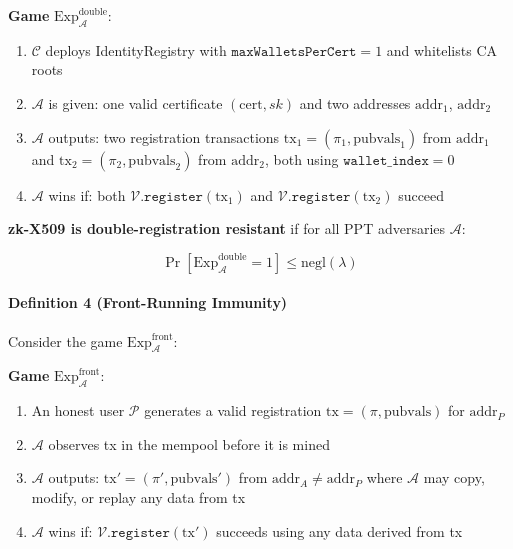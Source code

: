 \documentclass[11pt, a4paper]{article}
\begin{document}
\begin{mdframed}[linewidth=0.5pt, innertopmargin=6pt, innerbottommargin=6pt]
\small
\textbf{Game} $\text{Exp}_{\mathcal{A}}^{\text{double}}$:
\begin{enumerate}[nosep,leftmargin=1.5em]
\item $\mathcal{C}$ deploys IdentityRegistry with $\texttt{maxWalletsPerCert} = 1$ and whitelists CA roots
\item $\mathcal{A}$ is given: one valid certificate $(\text{cert}, sk)$ and two addresses $\text{addr}_1$, $\text{addr}_2$
\item $\mathcal{A}$ outputs: two registration transactions $\text{tx}_1 = (\pi_1, \text{pubvals}_1)$ from $\text{addr}_1$ and $\text{tx}_2 = (\pi_2, \text{pubvals}_2)$ from $\text{addr}_2$, both using $\texttt{wallet\_index} = 0$
\item $\mathcal{A}$ wins if: both $\mathcal{V}.\texttt{register}(\text{tx}_1)$ and $\mathcal{V}.\texttt{register}(\text{tx}_2)$ succeed
\end{enumerate}
\end{mdframed}

\textbf{zk-X509 is double-registration resistant} if for all PPT
adversaries \(\mathcal{A}\):

\[\Pr[\text{Exp}_{\mathcal{A}}^{\text{double}} = 1] \leq \text{negl}(\lambda)\]

\paragraph{Definition 4 (Front-Running
Immunity)}\label{definition-4-front-running-immunity}

Consider the game \(\text{Exp}_{\mathcal{A}}^{\text{front}}\):

\begin{mdframed}[linewidth=0.5pt, innertopmargin=6pt, innerbottommargin=6pt]
\small
\textbf{Game} $\text{Exp}_{\mathcal{A}}^{\text{front}}$:
\begin{enumerate}[nosep,leftmargin=1.5em]
\item An honest user $\mathcal{P}$ generates a valid registration $\text{tx} = (\pi, \text{pubvals})$ for $\text{addr}_P$
\item $\mathcal{A}$ observes tx in the mempool before it is mined
\item $\mathcal{A}$ outputs: $\text{tx}' = (\pi', \text{pubvals}')$ from $\text{addr}_A \neq \text{addr}_P$ where $\mathcal{A}$ may copy, modify, or replay any data from tx
\item $\mathcal{A}$ wins if: $\mathcal{V}.\texttt{register}(\text{tx}')$ succeeds using any data derived from tx
\end{enumerate}
\end{mdframed}
\end{document}
